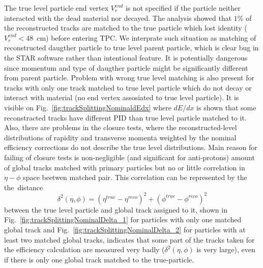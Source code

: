 The true level particle end vertex $V_r^{end}$ is not specified if the particle neither interacted with the dead material nor decayed. The analysis showed that $1\%$ of the reconstructed tracks are matched to the true particle which lost identity ($V_r^{end}<48$~cm) before entering TPC. We interprate such situation as matching of reconstructed daugther particle to true level parent particle, which is clear bug in the STAR software rather than intentional feature. It is potentially dangerous since  momentum and type of daugther particle might be significantly different from parent particle.  Problem with wrong true level matching is also present for tracks with only one track matched to true level particle which do not decay or interact with material (no end vertex assosiated to true  level particle). 
It is visible on Fig.~\ref{fig:trackSplittingNominaldEdx} where $dE/dx$ is shown that some reconstracted tracks 
have different PID than true level particle matched to it.
 Also, there are problems in the closure tests, where  the  reconstructed-level distributions of rapidity and transverse momenta weighted by the nominal efficiency corrections do not describe the true level distributions. Main reason for failing of closure tests is non-negligible (and significant   for anti-protons) amount of global tracks matched with primary particles but no or little correlation in $\eta-\phi$ space beetwen
matched pair. 
This correlation can be represented by the the~distance 
\begin{equation}\label{eq:tpcMatchingDeltaSquare}
\delta^{2}\left(\eta,\phi\right)=\left(\eta^{true}-\eta^{reco}\right)^2+\left(\phi^{true}-\phi^{reco}\right)^2
\end{equation}
between the true level particle and global track assigned to it, shown in Fig.~\ref{fig:trackSplittingNominalDelta_1} for particles with only one  matched global track and Fig.~\ref{fig:trackSplittingNominalDelta_2} for particles with at least two  matched global tracks, indicates that some part of the tracks taken for the efficiency calculation are measured very badly ($\delta^{2}\left(\eta,\phi\right)$ is very large), even if there is only one global track matched to the true-particle.
